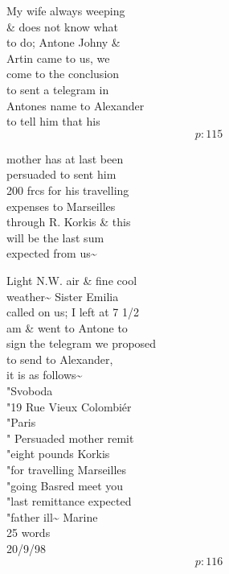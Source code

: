 \documentclass{report}
\begin{document}
	\par{
 	My wife always weeping\ \\\& does not know what\ \\to do; Antone Johny \&\ \\Artin came to us, we\ \\come to the conclusion\ \\to sent a telegram in\ \\Antones name to Alexander\ \\to tell him that his\ \\
  \[p: 115 \]

	}






	\par{
 	mother has at last been\ \\persuaded to sent him\ \\200 frcs for his travelling\ \\expenses to Marseilles\ \\through R. Korkis \& this\ \\will be the last sum\ \\expected from us\~{}\ \\
	}

	\par{
 	Light N.W. air \& fine cool\ \\weather\~{} Sister Emilia\ \\called on us; I left at 7 1/2\ \\am \& went to Antone to\ \\sign the telegram we proposed\ \\to send to Alexander,\ \\it is as follows\~{}\ \\"Svoboda\ \\"19 Rue Vieux Colombiér\ \\"Paris\ \\" Persuaded mother remit\ \\"eight pounds Korkis\ \\"for travelling Marseilles\ \\"going Basred meet you\ \\"last remittance expected\ \\"father ill\~{} Marine\ \\25 words\ \\20/9/98\ \\
  \[p: 116 \]

	}
\end{document}
